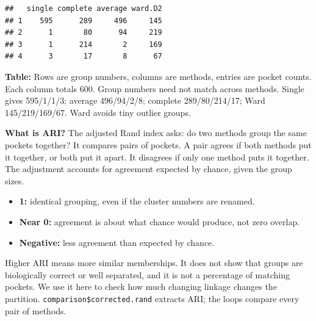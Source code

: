 \documentclass[
  10pt,
]{article}
\providecommand{\tightlist}{%
  \setlength{\itemsep}{0pt}\setlength{\parskip}{0pt}}
\begin{document}
\begin{verbatim}
##   single complete average ward.D2
## 1    595      289     496     145
## 2      1       80      94     219
## 3      1      214       2     169
## 4      3       17       8      67
\end{verbatim}

\textbf{Table:} Rows are group numbers, columns are methods, entries are
pocket counts. Each column totals 600. Group numbers need not match
across methods. Single gives 595/1/1/3; average 496/94/2/8; complete
289/80/214/17; Ward 145/219/169/67. Ward avoids tiny outlier groups.

\textbf{What is ARI?} The adjusted Rand index asks: do two methods group
the same pockets together? It compares pairs of pockets. A pair agrees
if both methods put it together, or both put it apart. It disagrees if
only one method puts it together. The adjustment accounts for agreement
expected by chance, given the group sizes.

\begin{itemize}
\tightlist
\item
  \textbf{1:} identical grouping, even if the cluster numbers are
  renamed.
\item
  \textbf{Near 0:} agreement is about what chance would produce, not
  zero overlap.
\item
  \textbf{Negative:} less agreement than expected by chance.
\end{itemize}

Higher ARI means more similar memberships. It does not show that groups
are biologically correct or well separated, and it is not a percentage
of matching pockets. We use it here to check how much changing linkage
changes the partition. \texttt{comparison\$corrected.rand} extracts ARI;
the loops compare every pair of methods.
\end{document}

